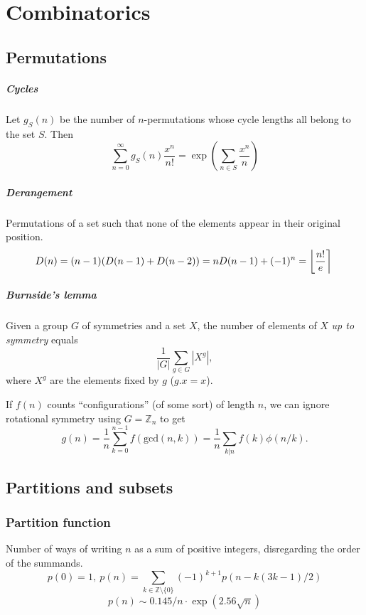 \chapter{Combinatorics}
\footnotesize
\section{Permutations}
	\paragraph{Cycles}
		Let $g_S(n)$ be the number of $n$-permutations whose cycle lengths all belong to the set $S$. Then
		$$\sum_{n=0} ^\infty g_S(n) \frac{x^n}{n!} = \exp\left(\sum_{n\in S} \frac{x^n} {n} \right)$$

	\paragraph{Derangement}
		Permutations of a set such that none of the elements appear in their original position.
		$$ \mkern-2mu D(n) = (n-1)(D(n-1)+D(n-2)) = n D(n-1)+(-1)^n = \left\lfloor\frac{n!}{e}\right\rceil $$

	\paragraph{Burnside's lemma}
		Given a group $G$ of symmetries and a set $X$, the number of elements of $X$ \emph{up to symmetry} equals
		 $$ {\frac {1}{|G|}}\sum _{{g\in G}}|X^{g}|, $$
		 where $X^{g}$ are the elements fixed by $g$ ($g.x = x$).

		 If $f(n)$ counts ``configurations'' (of some sort) of length $n$, we can ignore rotational symmetry using $G = \mathbb Z_n$ to get
		 $$ g(n) = \frac 1 n \sum_{k=0}^{n-1}{f(\text{gcd}(n, k))} = \frac 1 n \sum_{k|n}{f(k)\phi(n/k)}. $$

\section{Partitions and subsets}
	\subsection{Partition function}
		Number of ways of writing $n$ as a sum of positive integers, disregarding the order of the summands.
		$$ p(0) = 1,\ p(n) = \sum_{k \in \mathbb Z \setminus \{0\}}{(-1)^{k+1} p(n - k(3k-1) / 2)} $$
		$$ p(n) \sim 0.145 / n \cdot \exp(2.56 \sqrt{n}) $$

